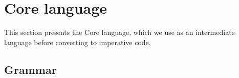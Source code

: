 \section{Core language}
\label{s:Core}

This section presents the Core language, which we use as an intermediate language before converting to imperative code.


\subsection{Grammar}



% 

